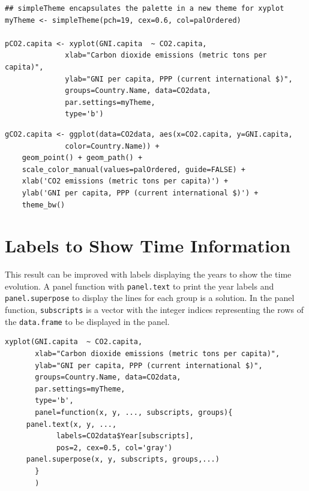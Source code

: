 
\lstset{language=R,numbers=none}
\begin{lstlisting}
## simpleTheme encapsulates the palette in a new theme for xyplot
myTheme <- simpleTheme(pch=19, cex=0.6, col=palOrdered)

pCO2.capita <- xyplot(GNI.capita  ~ CO2.capita,
		      xlab="Carbon dioxide emissions (metric tons per capita)",
		      ylab="GNI per capita, PPP (current international $)",
		      groups=Country.Name, data=CO2data,
		      par.settings=myTheme,
		      type='b')
\end{lstlisting}

\lstset{language=R,numbers=none}
\begin{lstlisting}
gCO2.capita <- ggplot(data=CO2data, aes(x=CO2.capita, y=GNI.capita,
		      color=Country.Name)) +
    geom_point() + geom_path() +
    scale_color_manual(values=palOrdered, guide=FALSE) +
    xlab('CO2 emissions (metric tons per capita)') +
    ylab('GNI per capita, PPP (current international $)') +
    theme_bw()
\end{lstlisting}
\section{Labels to Show Time Information}
\label{sec-3}
This result can be improved with labels displaying the years to show
the time evolution.  A panel function with \texttt{panel.text} to print the
year labels and \texttt{panel.superpose} to display the lines for each group
is a solution. In the panel function, \texttt{subscripts} is a vector with
the integer indices representing the rows of the \texttt{data.frame} to be
displayed in the panel.

 

\lstset{language=R,numbers=none}
\begin{lstlisting}
xyplot(GNI.capita  ~ CO2.capita,
       xlab="Carbon dioxide emissions (metric tons per capita)",
       ylab="GNI per capita, PPP (current international $)",
       groups=Country.Name, data=CO2data,
       par.settings=myTheme,
       type='b', 
       panel=function(x, y, ..., subscripts, groups){
	 panel.text(x, y, ...,
		    labels=CO2data$Year[subscripts],
		    pos=2, cex=0.5, col='gray')
	 panel.superpose(x, y, subscripts, groups,...)
       }
       )
\end{lstlisting}

